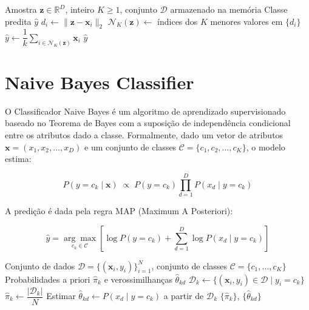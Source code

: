 \documentclass[12pt, a4paper]{article}
\theoremstyle{definition}
\theoremstyle{plain}
\theoremstyle{remark}
\begin{document}
\begin{algorithm}[H]
  \caption{KNN-Predição (Regressão)}
  \begin{algorithmic}[1]
    \Require Amostra $\mathbf{z} \in \mathbb{R}^{D}$, inteiro $K \geq 1$,
             conjunto $\mathcal{D}$ armazenado na memória
    \Ensure  Classe predita $\hat{y}$
      \State $d_i \gets \|\mathbf{z} - \mathbf{x}_i\|_2$
    \EndFor
    \State $\mathcal{N}_K(\mathbf{z}) \gets$ índices dos $K$ menores valores em $\{d_i\}$
    \State $\hat{y} \gets \dfrac{1}{k} \displaystyle\sum_{i \in \mathcal{N}_K(\mathbf{z})} \mathbf{x}_i$
    \State \Return $\hat{y}$
  \end{algorithmic}
\end{algorithm}

\section{Naive Bayes Classifier}

O Classificador Naive Bayes é um algoritmo de aprendizado supervisionado 
baseado no Teorema de Bayes com a suposição de independência condicional entre 
os atributos dado a classe. Formalmente, dado um vetor de atributos 
$\mathbf{x} = (x_1, x_2, \ldots, x_D)$ e um conjunto de classes
$\mathcal{C} = \{c_1, c_2, \ldots, c_K\}$, o modelo estima:

\begin{equation*}
  P(y = c_k \mid \mathbf{x}) \;\propto\; P(y = c_k)
  \prod_{d=1}^{D} P(x_d \mid y = c_k)
\end{equation*}

A predição é dada pela regra MAP (Maximum A Posteriori):

\begin{equation*}
  \hat{y} = \underset{c_k \in \mathcal{C}}{\arg\max}
  \left[ \log P(y = c_k) + \sum_{d=1}^{D} \log P(x_d \mid y = c_k) \right]
\end{equation*}

\begin{algorithm}[H]
  \caption{NaiveBayes-Treino}
  \begin{algorithmic}[1]
    \Require Conjunto de dados $\mathcal{D} = \{(\mathbf{x}_i, y_i)\}_{i=1}^{N}$,
             conjunto de classes $\mathcal{C} = \{c_1, \ldots, c_K\}$
    \Ensure  Probabilidades a priori $\hat{\pi}_k$ e verossimilhanças $\hat{\theta}_{kd}$
      \State $\mathcal{D}_k \gets \{(\mathbf{x}_i, y_i) \in \mathcal{D} \mid y_i = c_k\}$
      \State $\hat{\pi}_k \gets \dfrac{|\mathcal{D}_k|}{N}$
        \State Estimar $\hat{\theta}_{kd} \gets P(x_d \mid y = c_k)$ a partir de $\mathcal{D}_k$
      \EndFor
    \EndFor
    \State \Return $\{\hat{\pi}_k\}$, $\{\hat{\theta}_{kd}\}$
  \end{algorithmic}
\end{algorithm}
\end{document}
